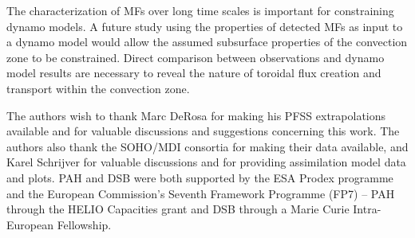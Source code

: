 \documentclass[namedreferences]{solarphysics}
\begin{document}
\begin{article}

The characterization of MFs over long time scales is important for constraining dynamo models. A future study using the properties of detected MFs as input to a dynamo model would allow the assumed subsurface properties of the convection zone to be constrained. Direct comparison between observations and dynamo model results are necessary to reveal the nature of toroidal flux creation and transport within the convection zone.


















\begin{acks}
The authors wish to thank Marc DeRosa for making his PFSS extrapolations available and for valuable discussions and suggestions concerning this work. The authors also thank the SOHO/MDI consortia for making their data available, and Karel Schrijver for valuable discussions and for providing assimilation model data and plots. PAH and DSB were both supported by the ESA Prodex programme and the European Commission's Seventh Framework Programme (FP7) -- PAH through the HELIO Capacities grant and DSB through a Marie Curie Intra-European Fellowship.
\end{acks}



\end{article}
\end{document}
